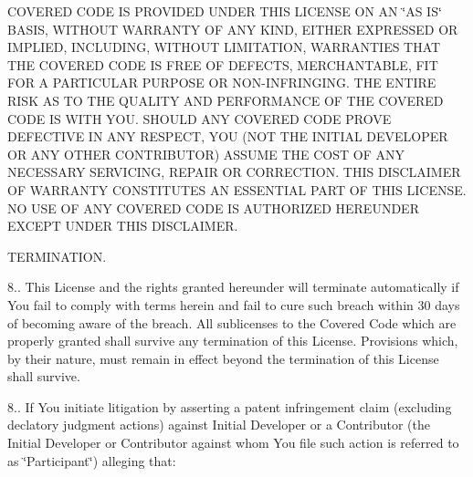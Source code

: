 \begin{DoxyEnumerate}
C\+O\+V\+E\+R\+E\+D C\+O\+D\+E I\+S P\+R\+O\+V\+I\+D\+E\+D U\+N\+D\+E\+R T\+H\+I\+S L\+I\+C\+E\+N\+S\+E O\+N A\+N \char`\"{}\+A\+S I\+S\char`\"{} B\+A\+S\+I\+S, W\+I\+T\+H\+O\+U\+T W\+A\+R\+R\+A\+N\+T\+Y O\+F A\+N\+Y K\+I\+N\+D, E\+I\+T\+H\+E\+R E\+X\+P\+R\+E\+S\+S\+E\+D O\+R I\+M\+P\+L\+I\+E\+D, I\+N\+C\+L\+U\+D\+I\+N\+G, W\+I\+T\+H\+O\+U\+T L\+I\+M\+I\+T\+A\+T\+I\+O\+N, W\+A\+R\+R\+A\+N\+T\+I\+E\+S T\+H\+A\+T T\+H\+E C\+O\+V\+E\+R\+E\+D C\+O\+D\+E I\+S F\+R\+E\+E O\+F D\+E\+F\+E\+C\+T\+S, M\+E\+R\+C\+H\+A\+N\+T\+A\+B\+L\+E, F\+I\+T F\+O\+R A P\+A\+R\+T\+I\+C\+U\+L\+A\+R P\+U\+R\+P\+O\+S\+E O\+R N\+O\+N-\/\+I\+N\+F\+R\+I\+N\+G\+I\+N\+G. T\+H\+E E\+N\+T\+I\+R\+E R\+I\+S\+K A\+S T\+O T\+H\+E Q\+U\+A\+L\+I\+T\+Y A\+N\+D P\+E\+R\+F\+O\+R\+M\+A\+N\+C\+E O\+F T\+H\+E C\+O\+V\+E\+R\+E\+D C\+O\+D\+E I\+S W\+I\+T\+H Y\+O\+U. S\+H\+O\+U\+L\+D A\+N\+Y C\+O\+V\+E\+R\+E\+D C\+O\+D\+E P\+R\+O\+V\+E D\+E\+F\+E\+C\+T\+I\+V\+E I\+N A\+N\+Y R\+E\+S\+P\+E\+C\+T, Y\+O\+U (N\+O\+T T\+H\+E I\+N\+I\+T\+I\+A\+L D\+E\+V\+E\+L\+O\+P\+E\+R O\+R A\+N\+Y O\+T\+H\+E\+R C\+O\+N\+T\+R\+I\+B\+U\+T\+O\+R) A\+S\+S\+U\+M\+E T\+H\+E C\+O\+S\+T O\+F A\+N\+Y N\+E\+C\+E\+S\+S\+A\+R\+Y S\+E\+R\+V\+I\+C\+I\+N\+G, R\+E\+P\+A\+I\+R O\+R C\+O\+R\+R\+E\+C\+T\+I\+O\+N. T\+H\+I\+S D\+I\+S\+C\+L\+A\+I\+M\+E\+R O\+F W\+A\+R\+R\+A\+N\+T\+Y C\+O\+N\+S\+T\+I\+T\+U\+T\+E\+S A\+N E\+S\+S\+E\+N\+T\+I\+A\+L P\+A\+R\+T O\+F T\+H\+I\+S L\+I\+C\+E\+N\+S\+E. N\+O U\+S\+E O\+F A\+N\+Y C\+O\+V\+E\+R\+E\+D C\+O\+D\+E I\+S A\+U\+T\+H\+O\+R\+I\+Z\+E\+D H\+E\+R\+E\+U\+N\+D\+E\+R E\+X\+C\+E\+P\+T U\+N\+D\+E\+R T\+H\+I\+S D\+I\+S\+C\+L\+A\+I\+M\+E\+R.
\item T\+E\+R\+M\+I\+N\+A\+T\+I\+O\+N.

8.. This License and the rights granted hereunder will terminate automatically if You fail to comply with terms herein and fail to cure such breach within 30 days of becoming aware of the breach. All sublicenses to the Covered Code which are properly granted shall survive any termination of this License. Provisions which, by their nature, must remain in effect beyond the termination of this License shall survive.

8.. If You initiate litigation by asserting a patent infringement claim (excluding declatory judgment actions) against Initial Developer or a Contributor (the Initial Developer or Contributor against whom You file such action is referred to as \char`\"{}\+Participant\char`\"{}) alleging that\+:


\end{DoxyEnumerate}
